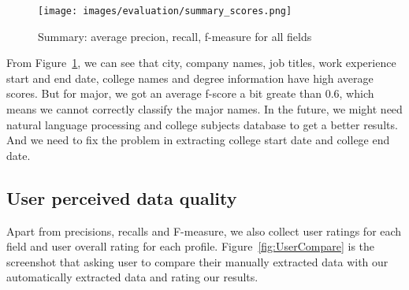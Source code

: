 \begin{figure}[H]
	\centering
	\texttt{[image: images/evaluation/summary\_scores.png]}
	\caption{Summary: average precion, recall, f-measure for all fields}
	\label{fig:summaryPRF}
\end{figure}

From Figure~\ref{fig:summaryPRF}, we can see that city, company names, job titles, work experience start and end date, college names and degree information have high average scores. But for major, we got an average f-score a bit greate than 0.6, which means we cannot correctly classify the major names. In the future, we might need natural language processing and college subjects database to get a better results. And we need to fix the problem in extracting college start date and college end date.

\subsection{User perceived data quality}
Apart from precisions, recalls and F-measure, we also collect user ratings for each field and user overall rating for each profile. Figure~\ref{fig:UserCompare} is the screenshot that asking user to compare their manually extracted data with our automatically extracted data and rating our results.

